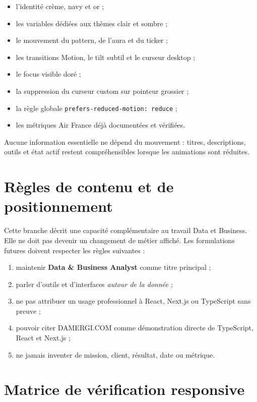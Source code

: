 \documentclass[11pt,a4paper]{article}
\newcommand{\tech}[1]{\texttt{#1}}
\begin{document}
\begin{itemize}
  \item l'identité crème, navy et or ;
  \item les variables dédiées aux thèmes clair et sombre ;
  \item le mouvement du pattern, de l'aura et du ticker ;
  \item les transitions Motion, le tilt subtil et le curseur desktop ;
  \item le focus visible doré ;
  \item la suppression du curseur custom sur pointeur grossier ;
  \item la règle globale \tech{prefers-reduced-motion: reduce} ;
  \item les métriques Air France déjà documentées et vérifiées.
\end{itemize}

Aucune information essentielle ne dépend du mouvement : titres, descriptions, outils et état
actif restent compréhensibles lorsque les animations sont réduites.

\section{Règles de contenu et de positionnement}

Cette branche décrit une capacité complémentaire au travail Data et Business. Elle ne doit pas
devenir un changement de métier affiché. Les formulations futures doivent respecter les règles
suivantes :

\begin{enumerate}
  \item maintenir \textbf{Data \& Business Analyst} comme titre principal ;
  \item parler d'outils et d'interfaces \emph{autour de la donnée} ;
  \item ne pas attribuer un usage professionnel à React, Next.js ou TypeScript sans preuve ;
  \item pouvoir citer DAMERGI.COM comme démonstration directe de TypeScript, React et Next.js ;
  \item ne jamais inventer de mission, client, résultat, date ou métrique.
\end{enumerate}

\section{Matrice de vérification responsive}
\end{document}
